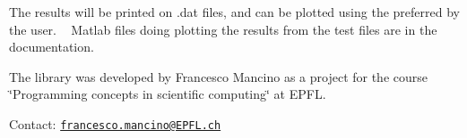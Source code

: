 The results will be printed on .dat files, and can be plotted using the preferred by the user. ~\newline
 Matlab files doing plotting the results from the test files are in the documentation.

The library was developed by Francesco Mancino as a project for the course \char`\"{}\+Programming concepts in scientific computing\char`\"{} at E\+P\+F\+L.

Contact\+: \href{mailto:francesco.mancino@EPFL.ch}{\tt francesco.\+mancino@\+E\+P\+F\+L.\+ch} 